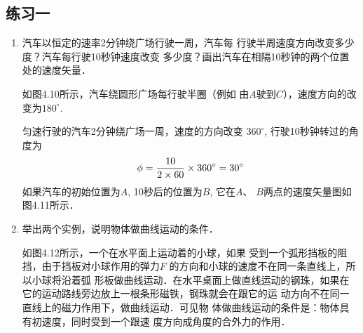 \subsection{练习一}
\begin{enumerate}
\item 汽车以恒定的速率2分钟绕广场行驶一周，汽车每
行驶半周速度方向改变多少度？汽车每行驶10秒钟速度改变
多少度？画出汽车在相隔10秒钟的两个位置处的速度矢量．

\begin{solution}
    如图4.10所示，汽车绕圆形广场每行驶半圈（例如
由$A$驶到$C$），速度方向的改变为$180^{\circ}$.

匀速行驶的汽车2分钟绕广场一周，速度的方向改变
$360^{\circ}$, 行驶10秒钟转过的角度为
\[\phi=\frac{10}{2\times 60}\times 360^{\circ}=30^{\circ}\]
如果汽车的初始位置为$A$, 10秒后的位置为$B$, 它在$A$、
$B$两点的速度矢量图如图4.11所示．
\begin{figure}[htp]\centering
    \begin{minipage}[t]{0.48\textwidth}
    \centering
{}
    \caption{}
    \end{minipage}
    \begin{minipage}[t]{0.48\textwidth}
    \centering
{}
    \caption{}
    \end{minipage}
    \end{figure}

\end{solution}
\item 举出两个实例，说明物体做曲线运动的条件．

\begin{solution}
    如图4.12所示，一个在水平面上运动着的小球，如果
    受到一个弧形挡板的阻挡，由于挡板对小球作用的弹力$F$
的方向和小球的速度不在同一条直线上，所以小球将沿着弧
形板做曲线运动．在水平桌面上做直线运动的钢珠，如果在
它的运动路线旁边放上一根条形磁铁，钢珠就会在跟它的运
动方向不在同一直线上的磁力作用下，做曲线运动．可见物
体做曲线运动的条件是：物体具有初速度，同时受到一个跟速
度方向成角度的合外力的作用．


\end{solution}
\end{enumerate}
